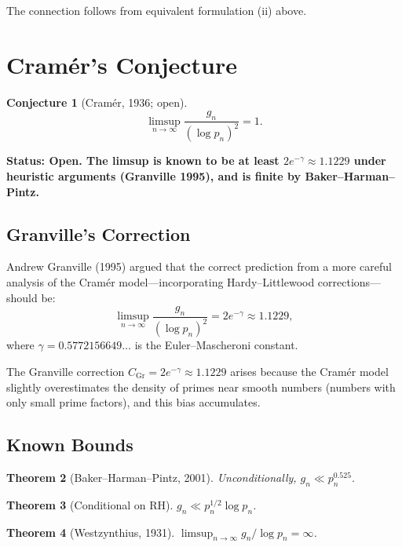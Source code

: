 \documentclass[12pt,a4paper]{amsart}
\newtheorem{theorem}{Theorem}[section]
\newtheorem{conjecture}[theorem]{Conjecture}
\theoremstyle{definition}
\begin{document}
The connection follows from equivalent formulation (ii) above.

\section{Cram\'{e}r's Conjecture}

\begin{conjecture}[Cram\'{e}r, 1936; open]
\label{conj:cramer}
\[
  \limsup_{n \to \infty} \frac{g_n}{(\log p_n)^2} = 1.
\]
\end{conjecture}

\textbf{Status: Open. The limsup is known to be at least $2e^{-\gamma} \approx
1.1229$ under heuristic arguments (Granville 1995), and is finite by
Baker--Harman--Pintz.}

\subsection{Granville's Correction}

Andrew Granville (1995) argued that the correct prediction from a more careful
analysis of the Cram\'{e}r model---incorporating Hardy--Littlewood
corrections---should be:
\[
  \limsup_{n \to \infty} \frac{g_n}{(\log p_n)^2} = 2e^{-\gamma} \approx 1.1229,
\]
where $\gamma = 0.5772156649\ldots$ is the Euler--Mascheroni constant.

The Granville correction $C_{\text{Gr}} = 2e^{-\gamma} \approx 1.1229$ arises
because the Cram\'{e}r model slightly overestimates the density of primes near
smooth numbers (numbers with only small prime factors), and this bias accumulates.

\subsection{Known Bounds}

\begin{theorem}[Baker--Harman--Pintz, 2001]
Unconditionally, $g_n \ll p_n^{0.525}$.
\end{theorem}

\begin{theorem}[Conditional on RH]
$g_n \ll p_n^{1/2} \log p_n$.
\end{theorem}

\begin{theorem}[Westzynthius, 1931]
$\limsup_{n\to\infty} g_n/\log p_n = \infty$.
\end{theorem}
\end{document}
